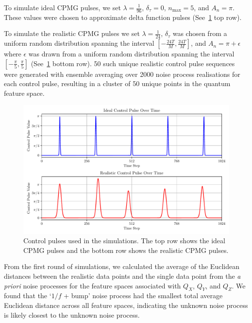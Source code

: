 \documentclass[12pt]{iopart}
\begin{document}
To simulate ideal CPMG pulses, we set $\lambda = \frac{1}{96}$, $\delta_{\tau} = 0$, $n_{\max} = 5$, and $A_n = \pi$. These values were chosen to approximate delta function pulses (See~\cref{fig:control_pulses_visualisation} top row).

To simulate the realistic CPMG pulses we set $\lambda = \frac{1}{24}$, $\delta_{\tau}$ was chosen from a uniform random distribution spanning the interval $[-\frac{24T}{M}, \frac{24T}{M}]$, and $A_n = \pi + \epsilon$ where $\epsilon$ was drawn from a uniform random distribution spanning the interval $[-\frac{\pi}{5}, \frac{\pi}{5}]$ (See~\cref{fig:control_pulses_visualisation} bottom row). 50 such unique realistic control pulse sequences were generated with ensemble averaging over 2000 noise process realisations for each control pulse, resulting in a cluster of 50 unique points in the quantum feature space.

\begin{figure}
    \centering
    \includegraphics[width=\textwidth]{figures/control_pulses.pdf}
    \caption{Control pulses used in the simulations. The top row shows the ideal CPMG pulses and the bottom row shows the realistic CPMG pulses.}
    \label{fig:control_pulses_visualisation}
\end{figure}

From the first round of simulations, we calculated the average of the Euclidean distances between the realistic data points and the single data point from the \textit{a priori} noise processes for the feature spaces associated with \(Q_X\), \(Q_Y\), and \(Q_Z\). We found that the `$1/f$ + bump' noise process had the smallest total average Euclidean distance across all feature spaces, indicating the unknown noise process is likely closest to the unknown noise process.
\end{document}
